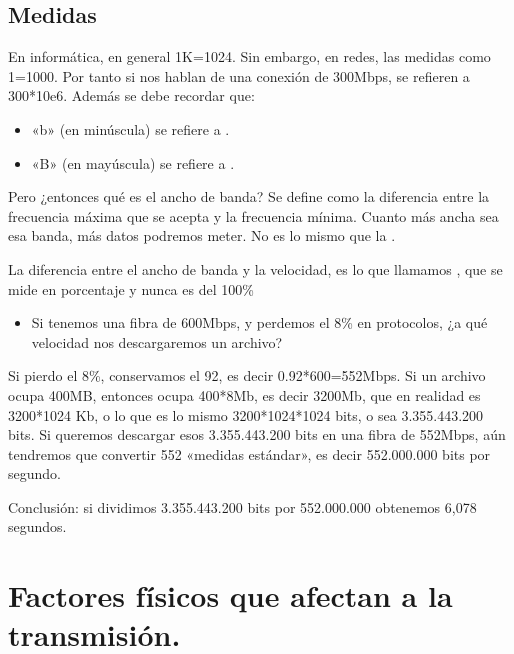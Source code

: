 \documentclass[letterpaper,10pt,spanish]{sphinxmanual}
\begin{document}
\subsection{Medidas}
\label{\detokenize{t2_integracion_elementos/apuntes_t2:medidas}}
\sphinxAtStartPar
En informática, en general 1K=1024. Sin embargo, en redes, las medidas como 1=1000. Por tanto si nos hablan de una conexión de 300Mbps, se refieren a 300*10e6. Además se debe recordar que:
\begin{itemize}
\item {} 
\sphinxAtStartPar
«b» (en minúscula) se refiere a .

\item {} 
\sphinxAtStartPar
«B» (en mayúscula) se refiere a .

\end{itemize}

\sphinxAtStartPar
Pero ¿entonces qué es el ancho de banda? Se define como la diferencia entre la frecuencia máxima que se acepta y la frecuencia mínima. Cuanto más ancha sea esa banda, más datos podremos meter. No es lo mismo que la .

\sphinxAtStartPar
La diferencia entre el ancho de banda y la velocidad, es lo que llamamos , que se mide en porcentaje y nunca es del 100\%
\begin{itemize}
\item {} 
\sphinxAtStartPar
Si tenemos una fibra de 600Mbps, y perdemos el 8\% en protocolos, ¿a qué velocidad nos descargaremos un archivo?

\end{itemize}

\sphinxAtStartPar
Si pierdo el 8\%, conservamos el 92, es decir 0.92*600=552Mbps. Si un archivo ocupa 400MB, entonces ocupa 400*8Mb, es decir 3200Mb, que en realidad es 3200*1024 Kb, o lo que es lo mismo 3200*1024*1024 bits, o sea 3.355.443.200 bits. Si queremos descargar esos 3.355.443.200 bits en una fibra de 552Mbps, aún tendremos que convertir 552 «medidas estándar», es decir 552.000.000 bits por segundo.

\sphinxAtStartPar
Conclusión: si dividimos 3.355.443.200 bits por 552.000.000 obtenemos 6,078 segundos.


\section{Factores físicos que afectan a la transmisión.}
\label{\detokenize{t2_integracion_elementos/apuntes_t2:factores-fisicos-que-afectan-a-la-transmision}}
\end{document}
